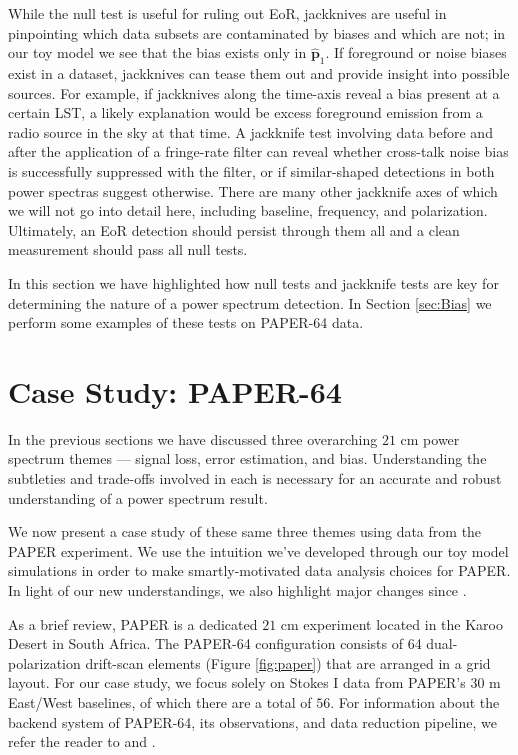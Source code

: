 \documentclass[preprint2,numberedappendix,tighten]{aastex6}  %
\begin{document}
While the null test is useful for ruling out EoR, jackknives are useful in pinpointing which data subsets are contaminated by biases and which are not; in our toy model we see that the bias exists only in $\hat{\textbf{p}}_{1}$. If foreground or noise biases exist in a dataset, jackknives can tease them out and provide insight into possible sources. For example, if jackknives along the time-axis reveal a bias present at a certain LST, a likely explanation would be excess foreground emission from a radio source in the sky at that time. A jackknife test involving data before and after the application of a fringe-rate filter can reveal whether cross-talk noise bias is successfully suppressed with the filter, or if similar-shaped detections in both power spectras suggest otherwise. There are many other jackknife axes of which we will not go into detail here, including baseline, frequency, and polarization. Ultimately, an EoR detection should persist through them all and a clean measurement should pass all null tests. 

In this section we have highlighted how null tests and jackknife tests are key for determining the nature of a power spectrum detection. In Section \ref{sec:Bias} we perform some examples of these tests on PAPER-64 data.

\section{Case Study: PAPER-64}
\label{sec:CaseStudy}

In the previous sections we have discussed three overarching $21$ cm power spectrum themes --- signal loss, error estimation, and bias. Understanding the subtleties and trade-offs involved in each is necessary for an accurate and robust understanding of a power spectrum result. 

We now present a case study of these same three themes using data from the PAPER experiment. We use the intuition we've developed through our toy model simulations in order to make smartly-motivated data analysis choices for PAPER. In light of our new understandings, we also highlight major changes since \citet{ali_et_al2015}.

As a brief review, PAPER is a dedicated $21$ cm experiment located in the Karoo Desert in South Africa. The PAPER-64 configuration consists of 64 dual-polarization drift-scan elements (Figure \ref{fig:paper}) that are arranged in a grid layout. For our case study, we focus solely on Stokes I data from PAPER's $30$ m East/West baselines, of which there are a total of $56$. For information about the backend system of PAPER-64, its observations, and data reduction pipeline, we refer the reader to \citet{parsons_et_al2010} and \citet{ali_et_al2015}.
\end{document}
